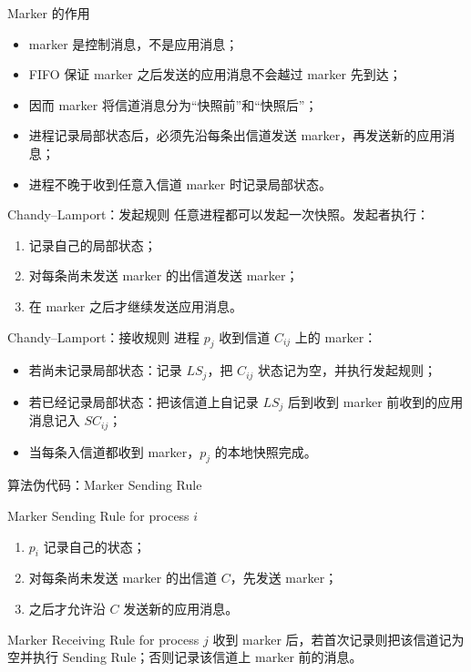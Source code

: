 \documentclass[UTF8,fontset=none,aspectratio=169,10pt]{beamer}
\begin{document}

\begin{frame}{Marker 的作用}
\begin{itemize}
  \item marker 是控制消息，不是应用消息；
  \item FIFO 保证 marker 之后发送的应用消息不会越过 marker 先到达；
  \item 因而 marker 将信道消息分为“快照前”和“快照后”；
  \item 进程记录局部状态后，必须先沿每条出信道发送 marker，再发送新的应用消息；
  \item 进程不晚于收到任意入信道 marker 时记录局部状态。
\end{itemize}
\end{frame}

\begin{frame}{Chandy--Lamport：发起规则}
任意进程都可以发起一次快照。发起者执行：
\begin{enumerate}
  \item 记录自己的局部状态；
  \item 对每条尚未发送 marker 的出信道发送 marker；
  \item 在 marker 之后才继续发送应用消息。
\end{enumerate}
\vfill
{}
\end{frame}

\begin{frame}{Chandy--Lamport：接收规则}
进程 $p_j$ 收到信道 $C_{ij}$ 上的 marker：
\begin{itemize}
  \item 若尚未记录局部状态：记录 $LS_j$，把 $C_{ij}$ 状态记为空，并执行发起规则；
  \item 若已经记录局部状态：把该信道上自记录 $LS_j$ 后到收到 marker 前收到的应用消息记入 $SC_{ij}$；
  \item 当每条入信道都收到 marker，$p_j$ 的本地快照完成。
\end{itemize}
\end{frame}

\begin{frame}{算法伪代码：Marker Sending Rule}
\begin{block}{Marker Sending Rule for process $i$}
\begin{enumerate}
  \item $p_i$ 记录自己的状态；
  \item 对每条尚未发送 marker 的出信道 $C$，先发送 marker；
  \item 之后才允许沿 $C$ 发送新的应用消息。
\end{enumerate}
\end{block}
\vfill
\begin{block}{Marker Receiving Rule for process $j$}
收到 marker 后，若首次记录则把该信道记为空并执行 Sending Rule；否则记录该信道上 marker 前的消息。
\end{block}
\end{frame}
\end{document}
